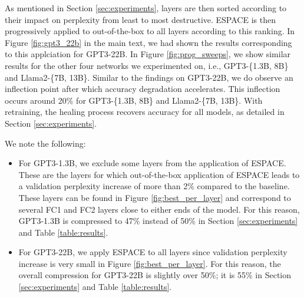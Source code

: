 \documentclass{article}
\theoremstyle{plain}
\begin{document}
As mentioned in Section \ref{sec:experiments}, layers are then sorted according to their impact on perplexity from least to most destructive. ESPACE is then progressively applied to out-of-the-box to all layers according to this ranking. In Figure \ref{fig:gpt3_22b} in the main text, we had shown the results corresponding to this applciation for GPT3-22B. In Figure \ref{fig:prog_sweeps}, we show similar results for the other four networks we experimented on, i.e., GPT3-\{1.3B, 8B\} and Llama2-\{7B, 13B\}. Similar to the findings on GPT3-22B, we do observe an inflection point after which accuracy degradation accelerates. This inflection occurs around 20\% for GPT3-\{1.3B, 8B\} and Llama2-\{7B, 13B\}. With retraining, the healing process recovers accuracy for all models, as detailed in Section \ref{sec:experiments}.

We note the following:
\begin{itemize}[leftmargin=1\baselineskip,itemsep=0\baselineskip,topsep=0pt]
\item For GPT3-1.3B, we exclude some layers from the application of ESPACE. These are the layers for which out-of-the-box application of ESPACE leads to a validation perplexity increase of more than 2\% compared to the baseline. These layers can be found in Figure \ref{fig:best_per_layer} and correspond to several FC1 and FC2 layers close to either ends of the model. For this reason, GPT3-1.3B is compressed to 47\% instead of 50\% in Section \ref{sec:experiments} and Table \ref{table:results}.
\item For GPT3-22B, we apply ESPACE to all layers since validation perplexity increase is very small in Figure \ref{fig:best_per_layer}. For this reason, the overall compression for GPT3-22B is slightly over 50\%; it is 55\% in Section \ref{sec:experiments} and Table \ref{table:results}.
\end{itemize}

\newpage
\end{document}
